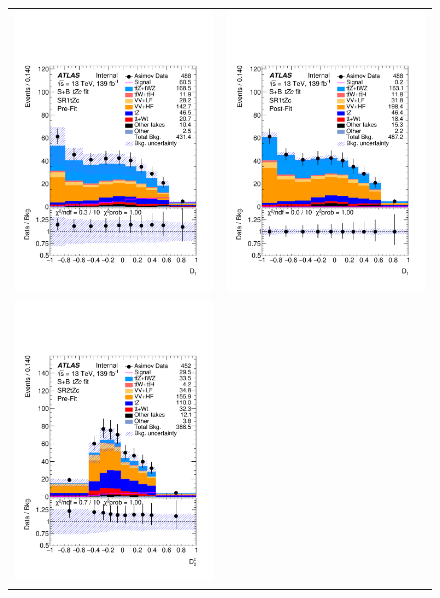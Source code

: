 \clearpage
\begin{figure}[htbp]
	\centering
	\begin{tabular}{cc}
		\includegraphics[width=.45\textwidth]{Chapters/CH8/figures/SPLUSB_CRSR_UsingDL1rcFullSys/Plots/SR1} &
		\includegraphics[width=.45\textwidth]{Chapters/CH8/figures/SPLUSB_CRSR_UsingDL1rcFullSys/Plots/SR1_postFit} \\
		\includegraphics[width=.45\textwidth]{Chapters/CH8/figures/SPLUSB_CRSR_UsingDL1rcFullSys/Plots/SR2} &

\end{tabular}
\end{figure}
